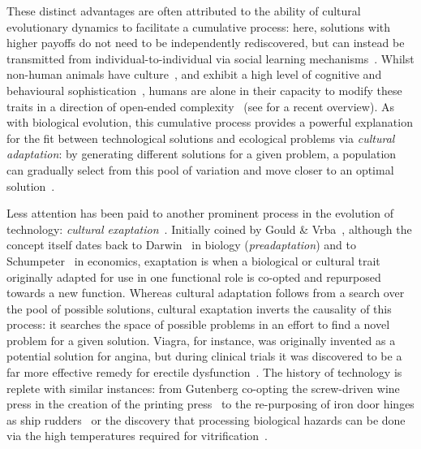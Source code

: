 \documentclass{article}
\begin{document}
These distinct advantages are often attributed to the ability of cultural evolutionary dynamics to facilitate a cumulative process: here, solutions with higher payoffs do not need to be independently rediscovered, but can instead be transmitted from individual-to-individual via social learning mechanisms~\cite{boyd_culture_1988,dean2014human,mesoudi_alex_what_2018}. Whilst non-human animals have culture~\cite{kawamura1959process, whiten1999cultures, hunt2004direct, krutzen2005cultural}, and exhibit a high level of cognitive and behavioural sophistication~\cite{emery2004mentality,penn2007causal,piantadosi2017true}, humans are alone in their capacity to modify these traits in a direction of open-ended complexity~\cite{Heyes_1993, tomasello_kruger_ratner_1993, boyd1996culture} (see \cite{mesoudi_alex_what_2018} for a recent overview). As with biological evolution, this cumulative process provides a powerful explanation for the fit between technological solutions and ecological problems via {\em cultural adaptation}: by generating different solutions for a given problem, a population can gradually select from this pool of variation and move closer to an optimal solution~\cite{boyd_culture_1988,boyd_why_1995,enquist_critical_2007,richerson_not_2008,henrich_secret_2015,laland_darwins_2018}.

Less attention has been paid to another prominent process in the evolution of technology: {\em cultural exaptation}~\cite{kauffman_origins_1993,mokyr1998induced,arthur2009nature,johnson2011good,solee2013evolutionary,andriani2013exaptation}. Initially coined by Gould \& Vrba~\cite{gould1982exaptation}, although the concept itself dates back to Darwin~\cite{darwin2004origin} in biology ({\em preadaptation}) and to Schumpeter~\cite{schumpeter1939business} in economics, exaptation is when a biological or cultural trait originally adapted for use in one functional role is co-opted and repurposed towards a new function. Whereas cultural adaptation follows from a search over the pool of possible solutions, cultural exaptation inverts the causality of this process: it searches the space of possible problems in an effort to find a novel problem for a given solution. Viagra, for instance, was originally invented as a potential solution for angina, but during clinical trials it was discovered to be a far more effective remedy for erectile dysfunction~\cite{andriani2015measuring}. The history of technology is replete with similar instances: from Gutenberg co-opting the screw-driven wine press in the creation of the printing press~\cite{solee2013evolutionary} to the re-purposing of iron door hinges as ship rudders~\cite{boyd2013cultural} or the discovery that processing biological hazards can be done via the high temperatures required for vitrification~\cite{dew2004economic}.
\end{document}
